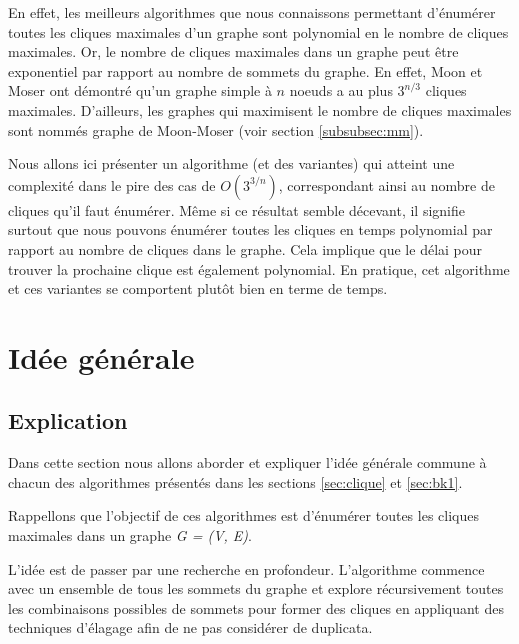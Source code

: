 \documentclass[12pt,a4paper]{article}
\begin{document}
En effet, les meilleurs algorithmes que nous connaissons permettant d'énumérer toutes les cliques maximales d'un graphe sont polynomial en le nombre de cliques maximales. Or, le nombre de cliques maximales dans un graphe peut être exponentiel par rapport au nombre de sommets du graphe. En effet, Moon et Moser ont démontré qu'un graphe simple à \(n\) noeuds a au plus \( 3^{n/3} \) cliques maximales\cite{MR0182577}. D'ailleurs, les graphes qui maximisent le nombre de cliques maximales sont nommés graphe de Moon-Moser (voir section \ref{subsubsec:mm}).

Nous allons ici présenter un algorithme (et des variantes) qui atteint une complexité dans le pire des cas de \(O(3^{3/n})\)\cite{CONTE20221}, correspondant ainsi au nombre de cliques qu'il faut énumérer. Même si ce résultat semble décevant, il signifie surtout que nous pouvons énumérer toutes les cliques en temps polynomial par rapport au nombre de cliques dans le graphe. Cela implique que le délai pour trouver la prochaine clique est également polynomial. En pratique, cet algorithme et ces variantes se comportent plutôt bien en terme de temps.

\section{Idée générale}%
\label{sec:idee}

\subsection{Explication}%
\label{subsec:explication}

Dans cette section nous allons aborder et expliquer l'idée générale commune à chacun des algorithmes présentés dans les sections \ref{sec:clique} et \ref{sec:bk1}.

Rappellons que l'objectif de ces algorithmes est d'énumérer toutes les cliques maximales dans un graphe \emph{G = (V, E)}.

L'idée est de passer par une recherche en profondeur. L'algorithme commence avec un ensemble de tous les sommets du graphe et explore récursivement toutes les combinaisons possibles de sommets pour former des cliques en appliquant des techniques d'élagage afin de ne pas considérer de duplicata.
\end{document}
